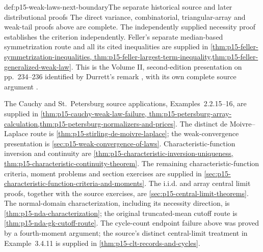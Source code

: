 \begin{proofboundary}{def:p15-weak-laws-next-boundary}{The separate historical source and later distributional proofs}
The direct variance, combinatorial, triangular-array and weak-tail
proofs above are complete. The independently supplied necessity proof
establishes the criterion independently. Feller's separate
median-based symmetrization route and all its cited inequalities are
supplied in \cref{thm:p15-feller-symmetrization-inequalities,
thm:p15-feller-largest-term-inequality,thm:p15-feller-generalized-weak-law}.
This is the Volume II, second-edition presentation on pp.~234--236
identified by Durrett's remark \cite[p.~63]{DurrettPTEAuthor2019},
with its own complete source argument
\cite[ch.~VII, sec.~7]{Feller1971ProbabilityII}.

The Cauchy and St.~Petersburg source applications, Examples~2.2.15--16,
are supplied in \cref{thm:p15-cauchy-weak-law-failure,
thm:p15-petersburg-array-calculation,thm:p15-petersburg-normalizers-and-prices}.
The distinct de Moivre--Laplace route is
\cref{thm:p15-stirling-de-moivre-laplace}; the weak-convergence
presentation is \cref{sec:p15-weak-convergence-of-laws}.
Characteristic-function inversion and continuity are
\cref{thm:p15-characteristic-inversion-uniqueness,
thm:p15-characteristic-continuity-theorem}. The remaining
characteristic-function criteria, moment problems and section exercises
are supplied in \cref{sec:p15-characteristic-function-criteria-and-moments}.
The i.i.d. and array central limit proofs, together with the source exercises,
are \cref{sec:p15-central-limit-theorems}. The normal-domain
characterization, including its necessity direction, is
\cref{thm:p15-nda-characterization}; the original truncated-mean
cutoff route is \cref{thm:p15-nda-gk-cutoff-route}.
The cycle-count endpoint failure above was proved by a fourth-moment
argument; the source's distinct central-limit treatment in Example~3.4.11
is supplied in \cref{thm:p15-clt-records-and-cycles}.
\end{proofboundary}
